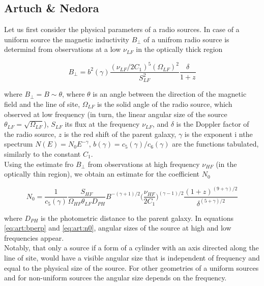\documentclass[11pt,a4paper,headinclude=true,DIV=14,BCOR=8mm,chapterprefix,listof=totoc,twoside,openright,abstracton]{scrbook}
\begin{document}
\subsection{Artuch \& Nedora}

Let us first consider the physical parameters of a radio sources. In case of a uniform source the magnetic inductivity $B_{\perp}$ of a unifrom radio source is determind from observations at a low $\nu_{LF}$ in the optically thick region 

\begin{equation}
    B_{\perp} = b^2(\gamma)\frac{(\nu_{LF}/2C_1)^5 (\Omega_{LF})^2}{S_{LF}^{2}}\frac{\delta}{1+z}
    \label{eq:art:bperp}
\end{equation}

where $B_{\perp} = B\sim\theta$, where $\theta$ is an angle between the direction of the magnetic field and the line of site, $\Omega_{LF}$ is the solid angle of the radio source, which observed at low frequency (in turn, the linear angular size of the source $\theta_{LF} = \sqrt{\Omega_{LF}}$), $S_{LF}$ its flux at the frequency $\nu_{LF}$, and $\delta$ is the Doppler factor of the radio source, $z$ is the red shift of the parent galaxy, $\gamma$ is the exponent i nthe spectrum $N(E) = N_0E^{-\gamma}$, $b(\gamma) = c_5(\gamma)/c_6(\gamma)$ are the functions tabulated, similarly to the constant $C_1$. \\

Using the estimate fro $B_{\perp}$ from observations at high frequency $\nu_{HF}$ (in the optically thin region), we obtain an estimate for the coefficient $N_0$

\begin{equation}
    N_0 = \frac{1}{c_5(\gamma)}\frac{S_{HF}}{\Omega_{HF}\theta_{LF}D_{PH}}B^{-(\gamma+1)/2}\Big(\frac{\nu_{HF}}{2C_1}\Big)^{(\gamma-1)/2}\frac{(1+z)^{(9+\gamma)/2}}{\delta^{(5+\gamma)/2}}
    \label{eq:art:n0}
\end{equation}

where $D_{PH}$ is the photometric distance to the parent galaxy. In equations \ref{eq:art:bperp} and \ref{eq:art:n0}, angular sizes of the source at high and low frequencies appear. \\
Notably, that only a source if a form of a cylinder with an axis directed along the line of site, would have a visible angular size that is independent of frequency and equal to the physical size of the source. For other geometries of a uniform sources and for non-uniform sources the angular size depends on the frequency. \\
\end{document}
